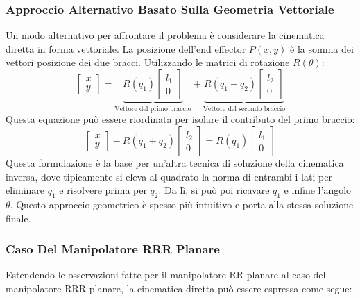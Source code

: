 ﻿\documentclass[11pt, a4paper]{article}
\begin{document}
\subsubsection*{Approccio Alternativo Basato Sulla Geometria Vettoriale}
Un modo alternativo per affrontare il problema è considerare la cinematica diretta in forma vettoriale. La posizione dell'end effector $P(x,y)$ è la somma dei vettori posizione dei due bracci. Utilizzando le matrici di rotazione $R(\theta)$:
\[
    \begin{bmatrix}
        x \\
        y
    \end{bmatrix}
    =
    \underbrace{R(q_1)
    \begin{bmatrix}
        l_1 \\
        0
    \end{bmatrix}}_{\text{Vettore del primo braccio}}
    +
    \underbrace{R(q_1 + q_2)
    \begin{bmatrix}
        l_2 \\
        0
    \end{bmatrix}}_{\text{Vettore del secondo braccio}}
\]
Questa equazione può essere riordinata per isolare il contributo del primo braccio:
\[
    \begin{bmatrix}
        x \\
        y
    \end{bmatrix}
    -R(q_1 + q_2)
    \begin{bmatrix}
        l_2 \\
        0
    \end{bmatrix}
    =
    R(q_1)
    \begin{bmatrix}
        l_1 \\
        0
    \end{bmatrix}
\]
Questa formulazione è la base per un'altra tecnica di soluzione della cinematica inversa, dove tipicamente si eleva al quadrato la norma di entrambi i lati per eliminare $q_1$ e risolvere prima per $q_2$. Da lì, si può poi ricavare $q_1$ e infine l'angolo $\theta$. Questo approccio geometrico è spesso più intuitivo e porta alla stessa soluzione finale.
\newpage
\subsubsection*{Caso Del Manipolatore RRR Planare}
Estendendo le osservazioni fatte per il manipolatore RR planare al caso del manipolatore RRR planare, la cinematica diretta può essere espressa come segue:
\end{document}
